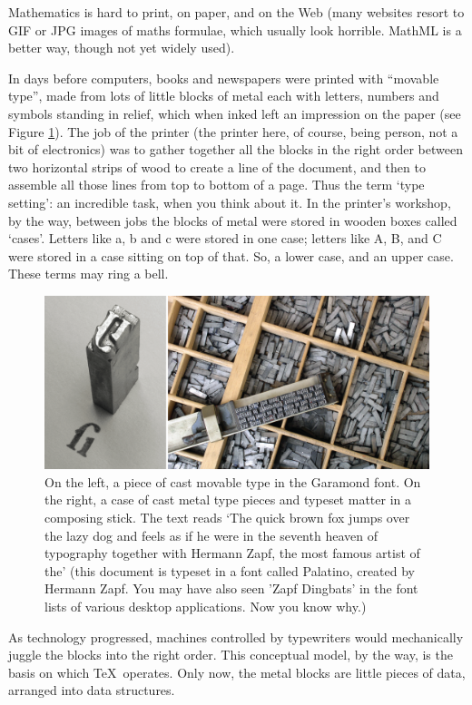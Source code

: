 Mathematics is hard to print, on paper, and on the Web (many websites resort to GIF or JPG images of maths formulae, which usually look horrible. MathML is a better way, though not yet widely used).

In days before computers, books and newspapers were printed with ``movable type'', made from lots of little blocks of metal each with letters, numbers and symbols standing in relief, which when inked left an impression on the paper (see Figure \ref{figure:movabletype}). The job of the printer (the printer here, of course, being person, not a bit of electronics) was to gather together all the blocks in the right order between two horizontal strips of wood to create a line of the document, and then to assemble all those lines from top to bottom of a page. Thus the term `type setting': an incredible task, when you think about it. In the printer's workshop, by the way, between jobs the blocks of metal were stored in wooden boxes called `cases'. Letters like a, b and c were stored in one case; letters like A, B, and C were stored in a case sitting on top of that. So, a lower case, and an upper case. These terms may ring a bell.

\begin{figure}
\centerline{\includegraphics[width=12cm]{images/movable-type.png}}
\caption{On the left, a piece of cast movable type in the Garamond font. On the right, a case of cast metal type pieces and typeset matter in a composing stick. The text reads `The quick brown fox jumps over the lazy dog and feels as if he were in the seventh heaven of typography together with Hermann Zapf, the most famous artist of the' (this document is typeset in a font called Palatino, created by Hermann Zapf. You may have also seen 'Zapf Dingbats' in the font lists of various desktop applications. Now you know why.)} \label{figure:movabletype}
\end{figure}

As technology progressed, machines controlled by typewriters would mechanically juggle the blocks into the right order. This conceptual model, by the way, is the basis on which \TeX\ operates. Only now, the metal blocks are little pieces of data, arranged into data structures. 

